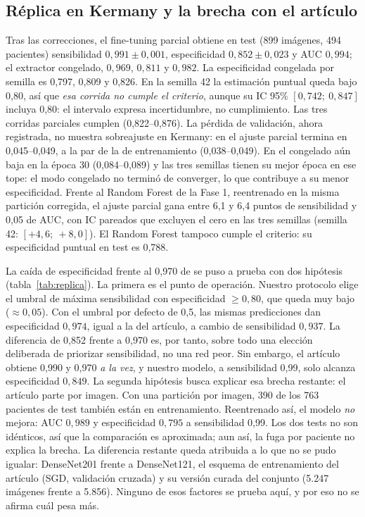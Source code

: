 \documentclass[11pt]{article}
\begin{document}
\subsection{Réplica en Kermany y la brecha con el artículo}
Tras las correcciones, el fine-tuning parcial obtiene en test (899 imágenes, 494 pacientes) sensibilidad $0{,}991\pm0{,}001$, especificidad $0{,}852\pm0{,}023$ y AUC $0{,}994$; el extractor congelado, $0{,}969$, $0{,}811$ y $0{,}982$. La especificidad congelada por semilla es 0,797, 0,809 y 0,826. En la semilla 42 la estimación puntual queda bajo 0,80, así que \emph{esa corrida no cumple el criterio}, aunque su IC 95\% $[0{,}742;\ 0{,}847]$ incluya 0,80: el intervalo expresa incertidumbre, no cumplimiento. Las tres corridas parciales cumplen (0,822--0,876). La pérdida de validación, ahora registrada, no muestra sobreajuste en Kermany: en el ajuste parcial termina en 0,045--0,049, a la par de la de entrenamiento (0,038--0,049). En el congelado aún baja en la época 30 (0,084--0,089) y las tres semillas tienen su mejor época en ese tope: el modo congelado no terminó de converger, lo que contribuye a su menor especificidad. Frente al Random Forest de la Fase 1, reentrenado en la misma partición corregida, el ajuste parcial gana entre 6,1 y 6,4 puntos de sensibilidad y 0,05 de AUC, con IC pareados que excluyen el cero en las tres semillas (semilla 42: $[+4{,}6;\ +8{,}0]$). El Random Forest tampoco cumple el criterio: su especificidad puntual en test es 0,788.

La caída de especificidad frente al 0,970 de \citet{rahman2020} se puso a prueba con dos hipótesis (tabla~\ref{tab:replica}). La primera es el punto de operación. Nuestro protocolo elige el umbral de máxima sensibilidad con especificidad $\geq0{,}80$, que queda muy bajo ($\approx0{,}05$). Con el umbral por defecto de 0,5, las mismas predicciones dan especificidad $0{,}974$, igual a la del artículo, a cambio de sensibilidad $0{,}937$. La diferencia de 0,852 frente a 0,970 es, por tanto, sobre todo una elección deliberada de priorizar sensibilidad, no una red peor. Sin embargo, el artículo obtiene 0,990 y 0,970 \emph{a la vez}, y nuestro modelo, a sensibilidad 0,99, solo alcanza especificidad $0{,}849$. La segunda hipótesis busca explicar esa brecha restante: el artículo parte por imagen. Con una partición por imagen, 390 de los 763 pacientes de test también están en entrenamiento. Reentrenado así, el modelo \emph{no} mejora: AUC $0{,}989$ y especificidad $0{,}795$ a sensibilidad 0,99. Los dos tests no son idénticos, así que la comparación es aproximada; aun así, la fuga por paciente no explica la brecha. La diferencia restante queda atribuida a lo que no se pudo igualar: DenseNet201 frente a DenseNet121, el esquema de entrenamiento del artículo (SGD, validación cruzada) y su versión curada del conjunto (5.247 imágenes frente a 5.856). Ninguno de esos factores se prueba aquí, y por eso no se afirma cuál pesa más.
\end{document}
